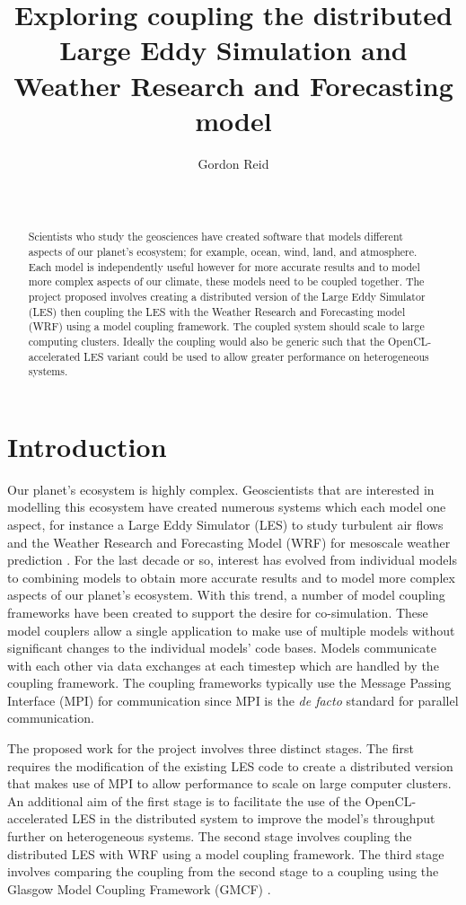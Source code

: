 \documentclass{acm_proc_article-sp}
\title{Exploring coupling the distributed Large Eddy Simulation and Weather
Research and Forecasting model}
\author{
    \alignauthor
    Gordon Reid\\
    \affaddr{School of Computing Science}\\
    \affaddr{University of Glasgow}\\
    \email{1002536r@student.gla.ac.uk}
}
\begin{document}
\maketitle

\begin{abstract}

Scientists who study the geosciences have created software that models different
aspects of our planet's ecosystem; for example, ocean, wind, land, and
atmosphere. Each model is independently useful however for more accurate results
and to model more complex aspects of our climate, these models need to be
coupled together. The project proposed involves creating a distributed version
of the Large Eddy Simulator (LES) then coupling the LES with the Weather
Research and Forecasting model (WRF) using a model coupling framework. The
coupled system should scale to large computing clusters. Ideally the coupling
would also be generic such that the OpenCL-accelerated LES variant could be used
to allow greater performance on heterogeneous systems.

\end{abstract}

\section*{Introduction}

Our planet's ecosystem is highly complex. Geoscientists that are interested in
modelling this ecosystem have created numerous systems which each model one
aspect, for instance a Large Eddy Simulator (LES) to study turbulent air flows
\cite{Nakayama2011,Nakayama2012} and the Weather Research and Forecasting Model
(WRF) for mesoscale weather prediction \cite{Michalakes2000}. For the last
decade or so, interest has evolved from individual models to combining models
\cite{Michalakes2010} to obtain more accurate results and to model more complex
aspects of our planet's ecosystem. With this trend, a number of model coupling
frameworks have been created to support the desire for co-simulation. These
model couplers allow a single application to make use of multiple models without
significant changes to the individual models' code bases. Models communicate
with each other via data exchanges at each timestep which are handled by the
coupling framework. The coupling frameworks typically use the Message Passing
Interface (MPI) for communication since MPI is the \textit{de facto} standard
for parallel communication.

The proposed work for the project involves three distinct stages. The first
requires the modification of the existing LES code to create a distributed
version that makes use of MPI to allow performance to scale on large computer
clusters. An additional aim of the first stage is to facilitate the use of the
OpenCL-accelerated LES \cite{Vanderbauwhede2014} in the distributed system to
improve the model's throughput further on heterogeneous systems. The second
stage involves coupling the distributed LES with WRF using a model coupling
framework. The third stage involves comparing the coupling from the second stage
to a coupling using the Glasgow Model Coupling Framework (GMCF)
\cite{Vanderbauwhede2014}.
\end{document}
